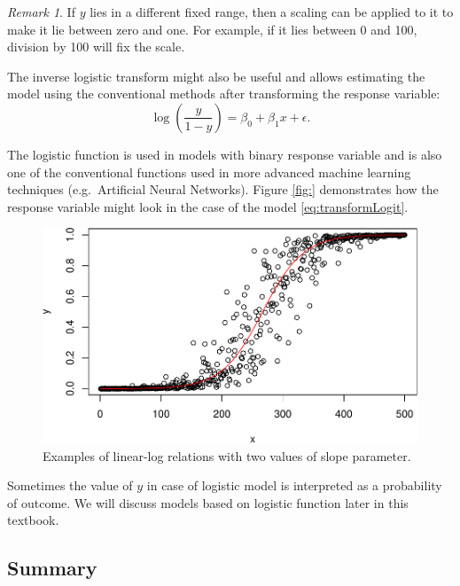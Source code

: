 \documentclass[
]{book}
\theoremstyle{definition}
\theoremstyle{definition}
\theoremstyle{definition}
\theoremstyle{definition}
\theoremstyle{remark}
\newtheorem*{remark}{Remark}
\begin{document}
\begin{remark}
If \(y\) lies in a different fixed range, then a scaling can be applied to it to make it lie between zero and one. For example, if it lies between 0 and 100, division by 100 will fix the scale.
\end{remark}

The inverse logistic transform might also be useful and allows estimating the model using the conventional methods after transforming the response variable:
\begin{equation}
    \log \left( \frac{y}{1-y}\right) = \beta_0 + \beta_1 x + \epsilon.
    \label{eq:transformLogitInverse}
\end{equation}

The logistic function is used in models with binary response variable and is also one of the conventional functions used in more advanced machine learning techniques (e.g.~Artificial Neural Networks). Figure \ref{fig:} demonstrates how the response variable might look in the case of the model \eqref{eq:transformLogit}.

\begin{figure}
\centering
\includegraphics{Svetunkov---Statistics-for-Business-Analytics_files/figure-latex/transformationsExamples06-1.pdf}
\caption{\label{fig:transformationsExamples06}Examples of linear-log relations with two values of slope parameter.}
\end{figure}

Sometimes the value of \(y\) in case of logistic model is interpreted as a probability of outcome. We will discuss models based on logistic function later in this textbook.

\subsection{Summary}\label{summary}
\end{document}
